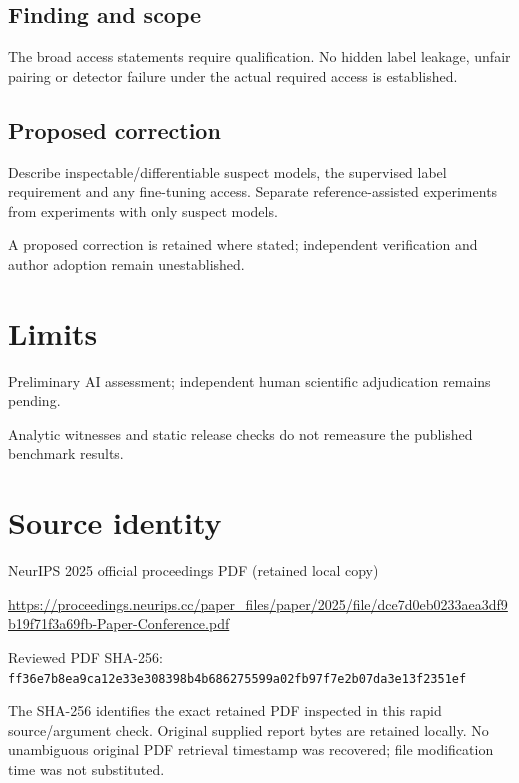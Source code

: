 \documentclass[11pt]{article}
\begin{document}
\subsection*{Finding and scope}

The broad access statements require qualification. No hidden label leakage, unfair pairing or detector failure under the actual required access is established.

\subsection*{Proposed correction}

Describe inspectable/differentiable suspect models, the supervised label requirement and any fine-tuning access. Separate reference-assisted experiments from experiments with only suspect models.

A proposed correction is retained where stated; independent verification and author adoption remain unestablished.

\section*{Limits}

Preliminary AI assessment; independent human scientific adjudication remains pending.\par

Analytic witnesses and static release checks do not remeasure the published benchmark results.\par

\section*{Source identity}

NeurIPS 2025 official proceedings PDF (retained local copy)

\url{https://proceedings.neurips.cc/paper_files/paper/2025/file/dce7d0eb0233aea3df9b19f71f3a69fb-Paper-Conference.pdf}

Reviewed PDF SHA-256: \nolinkurl{ff36e7b8ea9ca12e33e308398b4b686275599a02fb97f7e2b07da3e13f2351ef}

The SHA-256 identifies the exact retained PDF inspected in this rapid source/argument check. Original supplied report bytes are retained locally. No unambiguous original PDF retrieval timestamp was recovered; file modification time was not substituted.
\end{document}

